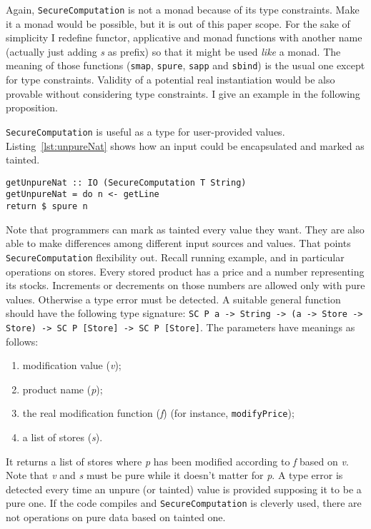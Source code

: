 Again, \texttt{SecureComputation} is not a monad because of its type constraints. Make it a monad would be possible, but it is out of this paper scope. For the sake of simplicity I redefine functor, applicative and monad functions with another name (actually just adding \textit{s} as prefix) so that it might be used \textit{like} a monad. The meaning of those functions (\texttt{smap}, \texttt{spure}, \texttt{sapp} and \texttt{sbind}) is the usual one except for type constraints. Validity of a potential real instantiation would be also provable without considering type constraints. I give an example in the following proposition.

\texttt{SecureComputation} is useful as a type for user-provided values. Listing~\ref{lst:unpureNat} shows how an input could be encapsulated and marked as tainted. 
\begin{lstlisting}[caption={Tainted natural number},label={lst:unpureNat}, breaklines=true]
getUnpureNat :: IO (SecureComputation T String)
getUnpureNat = do n <- getLine
return $ spure n
\end{lstlisting}
Note that programmers can mark as tainted every value they want. They are also able to make differences among different input sources and values. That points \texttt{SecureComputation} flexibility out. Recall running example, and in particular operations on stores. Every stored product has a price and a number representing its stocks. Increments or decrements on those numbers are allowed only with pure values. Otherwise a type error must be detected. A suitable general function should have the following type signature: \texttt{SC P a -> String -> (a -> Store -> Store) -> SC P [Store] -> SC P [Store]}. The parameters have meanings as follows:
\begin{enumerate}
	\item modification value (\textit{v});
	\item product name (\textit{p});
	\item the real modification function (\textit{f}) (for instance, \texttt{modifyPrice});
	\item a list of stores (\textit{s}).
\end{enumerate}
It returns a list of stores where \textit{p} has been modified according to \textit{f} based on \textit{v}. Note that \textit{v} and \textit{s} must be pure while it doesn't matter for \textit{p}. A type error is detected every time an unpure (or tainted) value is provided supposing it to be a pure one. If the code compiles and \texttt{SecureComputation} is cleverly used, there are not operations on pure data based on tainted one. 